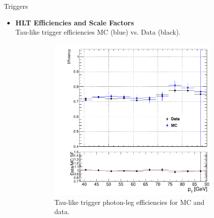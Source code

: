 \documentclass[9pt,aspectratio=1610]{beamer}
\newcommand{\khl}[1]{\textbf{\color{structure}#1}}
\begin{document}
\begin{frame}{Triggers}
	\begin{itemize}
		\item \khl{HLT Efficiencies and Scale Factors}\\
		Tau-like trigger efficiencies MC (blue) vs. Data (black).\\
		\vspace{0.5em}	
		\begin{figure}
			\centering
			\begin{subfigure}{0.45\linewidth}
				\includegraphics[width=\textwidth]{figures/misc/tau_trigger_photon_efficiencies.pdf}
				\vspace{-2em}
				\caption{Tau-like trigger photon-leg efficiencies for MC and data.}
			\end{subfigure}%
			\hfill
			\begin{subfigure}{0.45\linewidth}

\end{subfigure}
\end{figure}
\end{itemize}
\end{frame}
\end{document}
